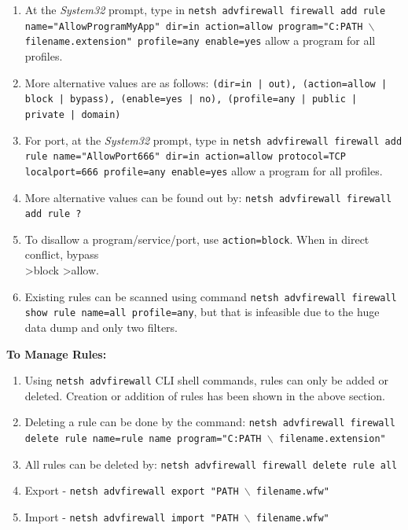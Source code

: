 \documentclass[12pt]{extarticle}
\begin{document}
\begin{enumerate}

\item At the \textit{System32} prompt, type in \texttt{netsh advfirewall firewall add rule name="AllowProgramMyApp" dir=in action=allow program="C:PATH $\backslash$ filename.extension" profile=any enable=yes} allow a program for all profiles.

\item More alternative values are as follows: \texttt{(dir=in | out), (action=allow | block | bypass), (enable=yes | no), (profile=any | public | \\private | domain)}

\item For port, at the \textit{System32} prompt, type in \texttt{netsh advfirewall firewall add rule name="AllowPort666" dir=in action=allow protocol=TCP \\ localport=666 profile=any enable=yes} allow a program for all profiles.

\item More alternative values can be found out by: \texttt{netsh advfirewall firewall add rule ?}

\item To disallow a program/service/port, use \texttt{action=block}. When in direct conflict, bypass \\ \textgreater block \textgreater allow. 

\item Existing rules can be scanned using command \texttt{netsh advfirewall firewall show rule name=all profile=any}, but that is infeasible due to the huge data dump and only two filters.
\end{enumerate}

\item \textbf{To Manage Rules:}

\begin{enumerate}
\item Using \texttt{netsh advfirewall} CLI shell commands, rules can only be added or deleted. Creation or addition of rules has been shown in the above section.
\item Deleting a rule can be done by the command: \texttt{netsh advfirewall firewall delete rule name=rule name program="C:PATH $\backslash$ filename.extension"}
\item All rules can be deleted by: \texttt{netsh advfirewall firewall delete rule all}
\item Export - \texttt{netsh advfirewall export "PATH $\backslash$ filename.wfw"}
\item Import - \texttt{netsh advfirewall import "PATH $\backslash$ filename.wfw"}
\end{enumerate}
\end{document}
